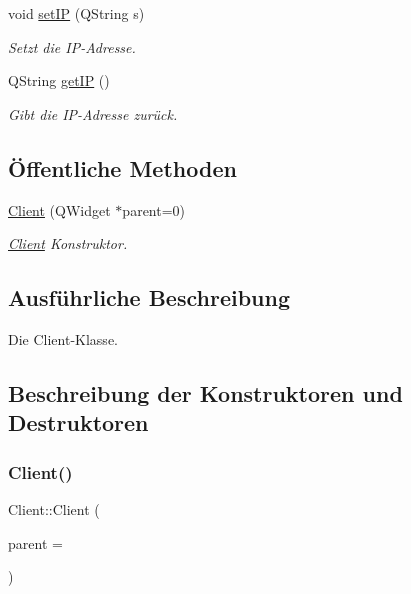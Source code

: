 \begin{DoxyCompactItemize}
void \hyperlink{class_client_a9699e2db43beff88b4694208c54c1b7f}{set\+IP} (Q\+String s)
\begin{DoxyCompactList}\small\item\em Setzt die I\+P-\/\+Adresse. \end{DoxyCompactList}\item 
Q\+String \hyperlink{class_client_a91bf1f59731649499365d8b18e6aee62}{get\+IP} ()
\begin{DoxyCompactList}\small\item\em Gibt die I\+P-\/\+Adresse zurück. \end{DoxyCompactList}\end{DoxyCompactItemize}
\subsection*{Öffentliche Methoden}
\begin{DoxyCompactItemize}
\item 
\hyperlink{class_client_ab9cb979d7fb7dd0bd3bf645279a6ffb5}{Client} (Q\+Widget $\ast$parent=0)
\begin{DoxyCompactList}\small\item\em \hyperlink{class_client}{Client} Konstruktor. \end{DoxyCompactList}\end{DoxyCompactItemize}


\subsection{Ausführliche Beschreibung}
Die Client-\/\+Klasse. 

\subsection{Beschreibung der Konstruktoren und Destruktoren}
\hypertarget{class_client_ab9cb979d7fb7dd0bd3bf645279a6ffb5}{}\label{class_client_ab9cb979d7fb7dd0bd3bf645279a6ffb5} 
\subsubsection{\texorpdfstring{Client()}{Client()}}
{\footnotesize\ttfamily Client\+::\+Client (\begin{DoxyParamCaption}\item[{Q\+Widget $\ast$}]{parent = {} }\end{DoxyParamCaption})\hspace{0.3cm}{\ttfamily [explicit]}}



